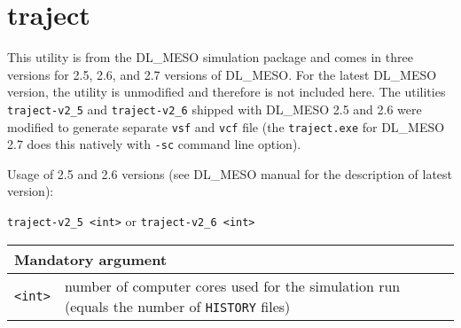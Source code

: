 \section{traject} \label{sec:traject}

This utility is from the DL\_MESO simulation package and comes in three
versions for 2.5, 2.6, and 2.7 versions of DL\_MESO. For the latest DL\_MESO
version, the utility is unmodified and therefore is not included here. The
utilities \texttt{traject-v2\_5} and \texttt{traject-v2\_6} shipped with
DL\_MESO 2.5 and 2.6 were modified to generate separate \texttt{vsf} and
\texttt{vcf} file (the \texttt{traject.exe} for DL\_MESO 2.7 does this
natively with \texttt{-sc} command line option).

Usage of 2.5 and 2.6 versions (see DL\_MESO manual for the description of
latest version):

\noindent
\vspace{1em}
\texttt{traject-v2\_5 <int>} or \texttt{traject-v2\_6 <int>}

\vspace{1em}
\noindent
\begin{longtable}{p{}p{}}
  \toprule
  \multicolumn{2}{l}{Mandatory argument} \\
  \midrule
  \texttt{<int>} & number of computer cores used for the simulation run
    (equals the number of \texttt{HISTORY} files) \\
  \bottomrule
\end{longtable}
